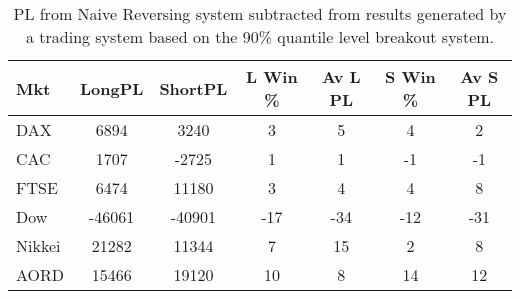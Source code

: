 \begin{table}[ht]
\centering
\caption[90\% quantile level breakout system minus Naive Reversing results]{PL from Naive Reversing system subtracted from results generated by a trading system based on the 90\% quantile level breakout system.} 
\label{tab:chp_ta_90q_diff}
\begin{tabular}{lcccccc}
  \toprule Mkt & LongPL & ShortPL & L Win \% & Av L PL & S Win \% & Av S PL \\ 
  \midrule DAX & 6894 & 3240 & 3 & 5 & 4 & 2 \\ 
  CAC & 1707 & -2725 & 1 & 1 & -1 & -1 \\ 
  FTSE & 6474 & 11180 & 3 & 4 & 4 & 8 \\ 
  Dow & -46061 & -40901 & -17 & -34 & -12 & -31 \\ 
  Nikkei & 21282 & 11344 & 7 & 15 & 2 & 8 \\ 
  AORD & 15466 & 19120 & 10 & 8 & 14 & 12 \\ 
   \bottomrule \end{tabular}
\end{table}
